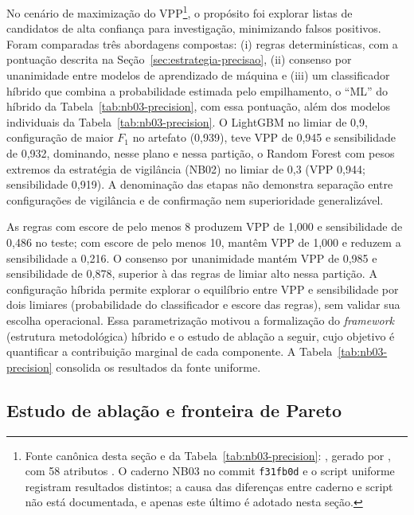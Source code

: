 No cenário de maximização do VPP\footnote{Fonte canônica desta seção e da Tabela~\ref{tab:nb03-precision}: , gerado por , com 58 atributos \cite{Jardim2026phdrepo}. O caderno NB03 no commit \texttt{f31fb0d} e o script uniforme registram resultados distintos; a causa das diferenças entre caderno e script não está documentada, e apenas este último é adotado nesta seção.}, o propósito foi explorar listas de candidatos de alta confiança para investigação, minimizando falsos positivos. Foram comparadas três abordagens compostas: (i) regras determinísticas, com a pontuação descrita na Seção~\ref{sec:estrategia-precisao}, (ii) consenso por unanimidade entre modelos de aprendizado de máquina e (iii) um classificador híbrido que combina a probabilidade estimada pelo empilhamento, o ``ML'' do híbrido da Tabela~\ref{tab:nb03-precision}, com essa pontuação, além dos modelos individuais da Tabela~\ref{tab:nb03-precision}. O LightGBM no limiar de 0,9, configuração de maior $F_1$ no artefato (0,939), teve VPP de 0,945 e sensibilidade de 0,932, dominando, nesse plano e nessa partição, o Random Forest com pesos extremos da estratégia de vigilância (NB02) no limiar de 0,3 (VPP 0,944; sensibilidade 0,919). A denominação das etapas não demonstra separação entre configurações de vigilância e de confirmação nem superioridade generalizável.

As regras com escore de pelo menos 8 produzem VPP de 1,000 e sensibilidade de 0,486 no teste; com escore de pelo menos 10, mantêm VPP de 1,000 e reduzem a sensibilidade a 0,216. O consenso por unanimidade mantém VPP de 0,985 e sensibilidade de 0,878, superior à das regras de limiar alto nessa partição. A configuração híbrida permite explorar o equilíbrio entre VPP e sensibilidade por dois limiares (probabilidade do classificador e escore das regras), sem validar sua escolha operacional. Essa parametrização motivou a formalização do \textit{framework} (estrutura metodológica) híbrido e o estudo de ablação a seguir, cujo objetivo é quantificar a contribuição marginal de cada componente. A Tabela~\ref{tab:nb03-precision} consolida os resultados da fonte uniforme.



\subsection{Estudo de ablação e fronteira de Pareto}\label{sec:cap5-ablacao-pareto}

